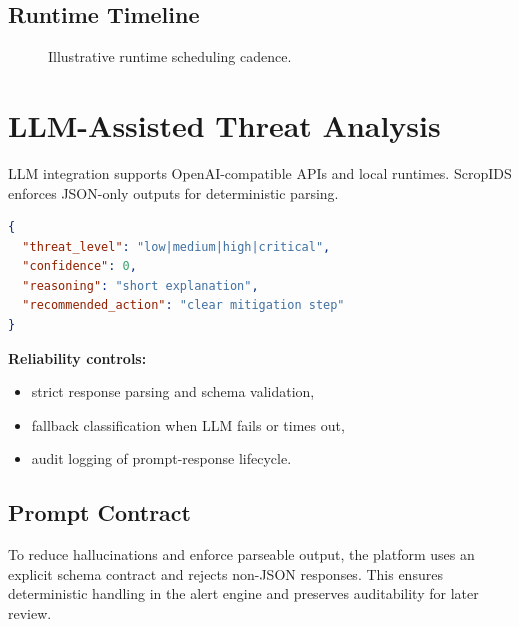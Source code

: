 \documentclass[conference]{IEEEtran}
\begin{document}
\subsection{Runtime Timeline}
\begin{figure}[!t]
\centering
{}
\caption{Illustrative runtime scheduling cadence.}
\label{fig:timeline}
\end{figure}
\FloatBarrier

\section{LLM-Assisted Threat Analysis}
LLM integration supports OpenAI-compatible APIs and local runtimes. ScropIDS enforces JSON-only outputs for deterministic parsing.

\begin{lstlisting}[language=json,caption={Expected LLM response schema}]
{
  "threat_level": "low|medium|high|critical",
  "confidence": 0,
  "reasoning": "short explanation",
  "recommended_action": "clear mitigation step"
}
\end{lstlisting}

\textbf{Reliability controls:}
\begin{itemize}[leftmargin=1.2em]
    \item strict response parsing and schema validation,
    \item fallback classification when LLM fails or times out,
    \item audit logging of prompt-response lifecycle.
\end{itemize}

\subsection{Prompt Contract}
To reduce hallucinations and enforce parseable output, the platform uses an explicit schema contract and rejects non-JSON responses. This ensures deterministic handling in the alert engine and preserves auditability for later review.
\end{document}
